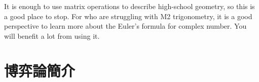 \documentclass[12pt]{article}
\begin{document}
    It is enough to use matrix operations to describe high-school geometry, so this is a good place to stop. For who are struggling with M2 trigonometry, it is a good perspective to learn more about the Euler's formula for complex number. You will benefit a lot from using it.
    \newpage
    \section*{博弈論簡介}
\end{document}
